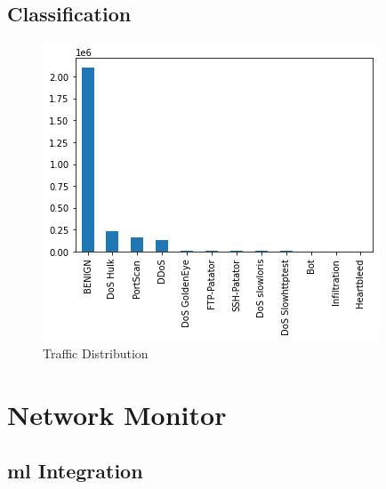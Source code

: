 
\subsection{Classification}
\label{subsec:classification}

\textcolor{dimgray}{\lipsum[1]}

\begin{figure}[h!]
    \centering
    \includegraphics[scale=0.6]{assets/figures/chapter3/traffic_distribution.png}
    \caption{Traffic Distribution}
    \label{fig:traffic-distribution}
\end{figure}


\section{Network Monitor}
\label{sec:monitor-implementation}

\textcolor{dimgray}{\lipsum[1]}


\subsection{\gls{ml} Integration}
\label{subsec:ml-integration}

\textcolor{dimgray}{\lipsum[1]}

